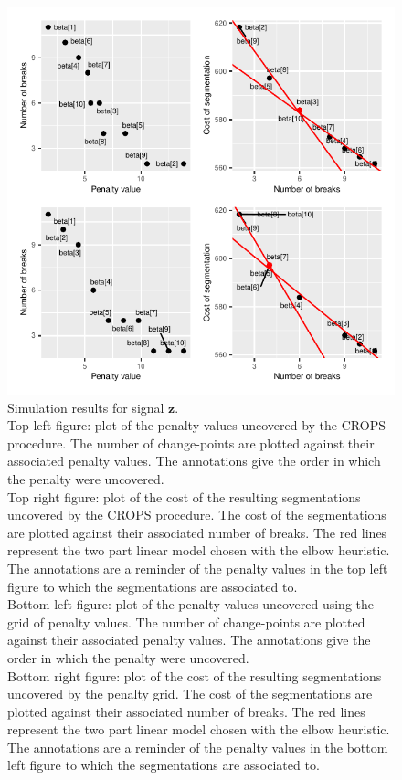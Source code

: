 \begin{figure}[htbp]
    \centering
    \includegraphics{figs/Chap4/RES_SIM_Z.pdf}
    \caption{Simulation results for signal $\bm z$. \\ 
    Top left figure: plot of the penalty values uncovered by the CROPS procedure. The number of change-points are plotted against their associated penalty values. The annotations give the order in which the penalty were uncovered. \\
    Top right figure: plot of the cost of the resulting segmentations uncovered by the CROPS procedure. The cost of the segmentations are plotted against their associated number of breaks. The red lines represent the two part linear model chosen with the elbow heuristic. The annotations are a reminder of the penalty values in the top left figure to which the segmentations are associated to. \\
    Bottom left figure: plot of the penalty values uncovered using the grid of penalty values. The number of change-points are plotted against their associated penalty values. The annotations give the order in which the penalty were uncovered. \\
    Bottom right figure: plot of the cost of the resulting segmentations uncovered by the penalty grid. The cost of the segmentations are plotted against their associated number of breaks. The red lines represent the two part linear model chosen with the elbow heuristic. The annotations are a reminder of the penalty values in the bottom left figure to which the segmentations are associated to.}
    \label{fig:res_sim_z}
\end{figure}

